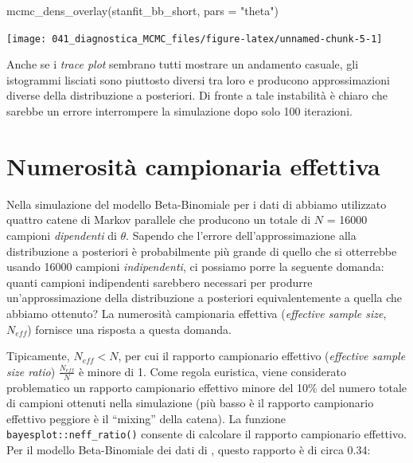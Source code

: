\documentclass[
  11pt,
  italian,
  a4paper,
  extrafontsizes,onecolumn,openright
  ]{memoir}
\newenvironment{Shaded}{\begin{snugshade}}{\end{snugshade}}
\newcommand{\AttributeTok}[1]{\textcolor[rgb]{0.77,0.63,0.00}{#1}}
\newcommand{\FunctionTok}[1]{\textcolor[rgb]{0.00,0.00,0.00}{#1}}
\newcommand{\NormalTok}[1]{#1}
\newcommand{\StringTok}[1]{\textcolor[rgb]{0.31,0.60,0.02}{#1}}
\begin{document}
\begin{Shaded}
\begin{Highlighting}[]
\FunctionTok{mcmc\_dens\_overlay}\NormalTok{(stanfit\_bb\_short, }\AttributeTok{pars =} \StringTok{"theta"}\NormalTok{)}
\end{Highlighting}
\end{Shaded}

\begin{center}\texttt{[image: 041\_diagnostica\_MCMC\_files/figure-latex/unnamed-chunk-5-1]} \end{center}

Anche se i \emph{trace plot} sembrano tutti mostrare un andamento casuale, gli istogrammi lisciati sono piuttosto diversi tra loro e producono approssimazioni diverse della distribuzione a posteriori. Di fronte a tale instabilità è chiaro che sarebbe un errore interrompere la simulazione dopo solo 100 iterazioni.

\hypertarget{numerosita-campionaria-effettiva}{%
\section{Numerosità campionaria effettiva}\label{numerosita-campionaria-effettiva}}

Nella simulazione del modello Beta-Binomiale per i dati di \textcite{Gautret_2020} abbiamo utilizzato quattro catene di Markov parallele che producono un totale di \(N\) = 16000 campioni \emph{dipendenti} di \(\theta\). Sapendo che l'errore dell'approssimazione alla distribuzione a posteriori è probabilmente più grande di quello che si otterrebbe usando 16000 campioni \emph{indipendenti}, ci possiamo porre la seguente domanda: quanti campioni indipendenti sarebbero necessari per produrre un'approssimazione della distribuzione a posteriori equivalentemente a quella che abbiamo ottenuto? La numerosità campionaria effettiva (\emph{effective sample size}, \(N_{eff}\)) fornisce una risposta a questa domanda.

Tipicamente, \(N_{eff} < N\), per cui il rapporto campionario effettivo (\emph{effective sample size ratio}) \(\frac{N_{eff}}{N}\) è minore di 1. Come regola euristica, viene considerato problematico un rapporto campionario effettivo minore del 10\% del numero totale di campioni ottenuti nella simulazione (più basso è il rapporto campionario effettivo peggiore è il ``mixing'' della catena). La funzione \texttt{bayesplot::neff\_ratio()} consente di calcolare il rapporto campionario effettivo. Per il modello Beta-Binomiale dei dati di \textcite{Gautret_2020}, questo rapporto è di circa 0.34:
\end{document}
